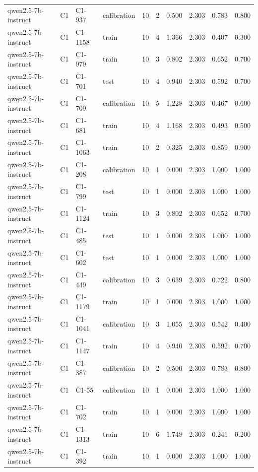 \begin{table}
\begin{tabular}{llllrrrrrr}
qwen2.5-7b-instruct & C1 & C1-937 & calibration & 10 & 2 & 0.500 & 2.303 & 0.783 & 0.800 \\
qwen2.5-7b-instruct & C1 & C1-1158 & train & 10 & 4 & 1.366 & 2.303 & 0.407 & 0.300 \\
qwen2.5-7b-instruct & C1 & C1-979 & train & 10 & 3 & 0.802 & 2.303 & 0.652 & 0.700 \\
qwen2.5-7b-instruct & C1 & C1-701 & test & 10 & 4 & 0.940 & 2.303 & 0.592 & 0.700 \\
qwen2.5-7b-instruct & C1 & C1-709 & calibration & 10 & 5 & 1.228 & 2.303 & 0.467 & 0.600 \\
qwen2.5-7b-instruct & C1 & C1-681 & train & 10 & 4 & 1.168 & 2.303 & 0.493 & 0.500 \\
qwen2.5-7b-instruct & C1 & C1-1063 & train & 10 & 2 & 0.325 & 2.303 & 0.859 & 0.900 \\
qwen2.5-7b-instruct & C1 & C1-208 & calibration & 10 & 1 & 0.000 & 2.303 & 1.000 & 1.000 \\
qwen2.5-7b-instruct & C1 & C1-799 & test & 10 & 1 & 0.000 & 2.303 & 1.000 & 1.000 \\
qwen2.5-7b-instruct & C1 & C1-1124 & train & 10 & 3 & 0.802 & 2.303 & 0.652 & 0.700 \\
qwen2.5-7b-instruct & C1 & C1-485 & test & 10 & 1 & 0.000 & 2.303 & 1.000 & 1.000 \\
qwen2.5-7b-instruct & C1 & C1-602 & test & 10 & 1 & 0.000 & 2.303 & 1.000 & 1.000 \\
qwen2.5-7b-instruct & C1 & C1-449 & calibration & 10 & 3 & 0.639 & 2.303 & 0.722 & 0.800 \\
qwen2.5-7b-instruct & C1 & C1-1179 & train & 10 & 1 & 0.000 & 2.303 & 1.000 & 1.000 \\
qwen2.5-7b-instruct & C1 & C1-1041 & calibration & 10 & 3 & 1.055 & 2.303 & 0.542 & 0.400 \\
qwen2.5-7b-instruct & C1 & C1-1147 & train & 10 & 4 & 0.940 & 2.303 & 0.592 & 0.700 \\
qwen2.5-7b-instruct & C1 & C1-387 & calibration & 10 & 2 & 0.500 & 2.303 & 0.783 & 0.800 \\
qwen2.5-7b-instruct & C1 & C1-55 & calibration & 10 & 1 & 0.000 & 2.303 & 1.000 & 1.000 \\
qwen2.5-7b-instruct & C1 & C1-702 & train & 10 & 1 & 0.000 & 2.303 & 1.000 & 1.000 \\
qwen2.5-7b-instruct & C1 & C1-1313 & train & 10 & 6 & 1.748 & 2.303 & 0.241 & 0.200 \\
qwen2.5-7b-instruct & C1 & C1-392 & train & 10 & 1 & 0.000 & 2.303 & 1.000 & 1.000 \\

\end{tabular}
\end{table}
